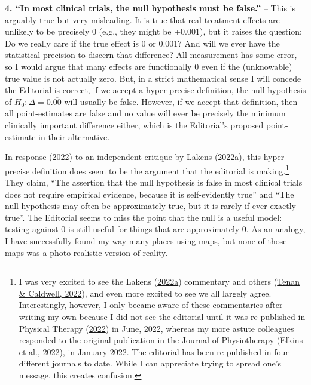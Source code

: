 \documentclass[]{cik}%
\begin{document}
\textbf{4. ``In most clinical trials, the null hypothesis must be
false.''} -- This is arguably true but very misleading. It is true that
real treatment effects are unlikely to be precisely 0 (e.g., they might
be +0.001), but it raises the question: Do we really care if the true
effect is 0 or 0.001? And will we ever have the statistical precision to
discern that difference? All measurement has some error, so I would
argue that many effects are functionally 0 even if the (unknowable) true
value is not actually zero. But, in a strict mathematical sense I will
concede the Editorial is correct, if we accept a hyper-precise
definition, the null-hypothesis of \(H_{0}: \Delta = 0.\overline{00}\)
will usually be false. However, if we accept that definition, then all
point-estimates are false and no value will ever be precisely the
minimum clinically important difference either, which is the Editorial's
proposed point-estimate in their alternative.

In response (\protect\hyperlink{ref-17}{2022}) to an independent
critique by Lakens (\protect\hyperlink{ref-18}{2022a}), this
hyper-precise definition does seem to be the argument that the editorial
is making.\footnote{I was very excited to see the Lakens
  (\protect\hyperlink{ref-18}{2022a}) commentary and others
  (\protect\hyperlink{ref-19}{Tenan \& Caldwell, 2022}), and even more
  excited to see we all largely agree. Interestingly, however, I only
  became aware of these commentaries after writing my own because I did
  not see the editorial until it was re-published in Physical Therapy
  (\protect\hyperlink{ref-1}{2022}) in June, 2022, whereas my more
  astute colleagues responded to the original publication in the Journal
  of Physiotherapy (\protect\hyperlink{ref-20}{Elkins et al., 2022}), in
  January 2022. The editorial has been re-published in four different
  journals to date. While I can appreciate trying to spread one's
  message, this creates confusion.} They claim, ``The assertion that the
null hypothesis is false in most clinical trials does not require
empirical evidence, because it is self-evidently true'' and ``The null
hypothesis may often be approximately true, but it is rarely if ever
exactly true''. The Editorial seems to miss the point that the null is a
useful model: testing against 0 is still useful for things that are
approximately 0. As an analogy, I have successfully found my way many
places using maps, but none of those maps was a photo-realistic version
of reality.
\end{document}
